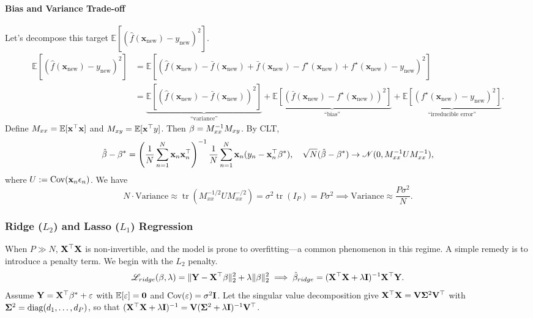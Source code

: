 \paragraph{Bias and Variance Trade-off}
Let’s decompose this target $\mathbb{E}\left[(\hat{f}(\mathbf{x}_{\mathrm{new}}) - y_{\mathrm{new}})^2\right]$.
\begin{align*}
\mathbb{E}\left[(\hat{f}(\mathbf{x}_{\mathrm{new}}) - y_{\mathrm{new}})^2\right]
&= \mathbb{E}\left[(\hat{f}(\mathbf{x}_{\mathrm{new}}) - \bar{f}(\mathbf{x}_{\mathrm{new}}) + \bar{f}(\mathbf{x}_{\mathrm{new}}) - f^{\star}(\mathbf{x}_{\mathrm{new}}) + f^{\star}(\mathbf{x}_{\mathrm{new}}) - y_{\mathrm{new}})^2\right] \\
&= \underbrace{\mathbb{E}\left[(\hat{f}(\mathbf{x}_{\mathrm{new}}) - \bar{f}(\mathbf{x}_{\mathrm{new}}))^2\right]}_{\text{``variance''}} + \underbrace{\mathbb{E}\left[(\bar{f}(\mathbf{x}_{\mathrm{new}}) - f^{\star}(\mathbf{x}_{\mathrm{new}}))^2\right]}_{\text{``bias''}} + \underbrace{\mathbb{E}\left[(f^{\star}(\mathbf{x}_{\mathrm{new}}) - y_{\mathrm{new}})^2\right]}_{\text{``irreducible error''}}.
\end{align*}
Define $M_{xx} = \mathbb{E} [\mathbf{x}^\top \mathbf{x}]$ and $M_{xy} = \mathbb{E}[\mathbf{x}^\top y]$. Then $\mathbf{\beta} = M_{xx}^{-1}M_{xy}$. By CLT,
\[
\hat{\mathbf{\beta}} - \mathbf{\beta}^*
= \left(\frac{1}{N} \sum_{n=1}^{N} \mathbf{x}_n \mathbf{x}_n^\top\right)^{-1} \frac{1}{N} \sum_{n=1}^{N} \mathbf{x}_n (y_n - \mathbf{x}_n^\top \mathbf{\beta}^*), \quad
\sqrt{N}(\hat{\mathbf{\beta}} - \mathbf{\beta}^*) \to \mathcal{N}(0, M_{xx}^{-1} U M_{xx}^{-1}),
\]
where $U := \operatorname{Cov}(\mathbf{x}_n \epsilon_n)$. We have
\[
N \cdot\text{Variance} \approx \operatorname{tr}(M_{xx}^{-1/2} U M_{xx}^{-/2}) = \sigma^2\operatorname{tr}(I_P) = P\sigma^2 \implies \text{Variance} \approx \frac{P\sigma^2}{N}.
\]

\subsubsection{Ridge ($L_2$) and Lasso ($L_1$) Regression}
When $P \gg N$, $\mathbf{X}^\top\mathbf{X}$ is non-invertible, and the model is prone to overfitting---a common phenomenon in this regime. A simple remedy is to introduce a penalty term. We begin with the $L_2$ penalty.
\[
\mathcal{L}_{ridge}(\mathbf{\beta}, \lambda) = \|\mathbf{Y}-\mathbf{X}^\top\mathbf{\beta}\|_2^2 + \lambda \|\mathbf{\beta}\|_2^2 \implies \hat{\mathbf{\beta}}_{ridge} = (\mathbf{X}^\top \mathbf{X} + \lambda \mathbf{I})^{-1} \mathbf{X}^\top \mathbf{Y}.
\]
Assume $\mathbf{Y} = \mathbf{X}^\top \mathbf{\beta}^* + \mathbf{\varepsilon}$ with $\mathbb{E}[\mathbf{\varepsilon}] = \mathbf{0}$ and $\mathrm{Cov}(\mathbf{\varepsilon}) = \sigma^2 \mathbf{I}$. Let the singular value decomposition give $\mathbf{X}^\top\mathbf{X} = \mathbf{V} \mathbf{\Sigma}^2 \mathbf{V}^\top$ with $\mathbf{\Sigma}^2 = \mathrm{diag}(d_1, \ldots, d_P)$, so that $(\mathbf{X}^\top\mathbf{X} + \lambda \mathbf{I})^{-1} = \mathbf{V} (\mathbf{\Sigma}^2 + \lambda \mathbf{I})^{-1} \mathbf{V}^\top$.

